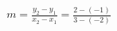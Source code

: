 \documentclass[preview]{standalone}
\begin{document}
\begin{align*}
m = \frac{y_2 - y_1}{x_2 - x_1} = \frac{2 - (-1)}{3 - (-2)}
\end{align*}
\end{document}
